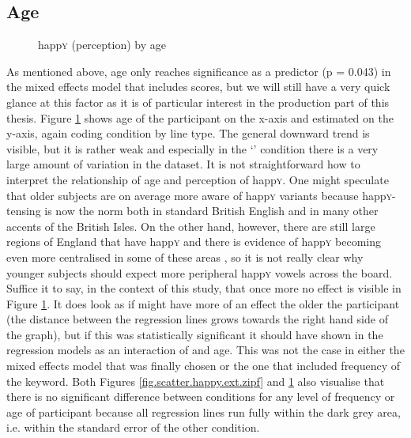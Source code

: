 \subsection{Age}
\label{sec.perc_res.happy.age}

\begin{figure}[h]
	\centering
		\resizebox{.49\linewidth}{!}{} 
	\caption{happ\textsc{y} (perception) by age}
	\label{fig.scatter.happy.ext.age}
\end{figure}

As mentioned above, age only reaches significance as a predictor (p = 0.043) in the mixed effects model that includes  scores, but we will still have a very quick glance at this factor as it is of particular interest in the production part of this thesis.
Figure \ref{fig.scatter.happy.ext.age} shows age of the participant on the x-axis and estimated  on the y-axis, again coding  condition by line type.
The general downward trend is visible, but it is rather weak and especially in the `' condition there is a very large amount of variation in the dataset.
It is not straightforward how to interpret the relationship of age and perception of happ\textsc{y}.
One might speculate that older subjects are on average more aware of  happ\textsc{y} variants because happ\textsc{y}-tensing is now the norm both in standard British English and in many other accents of the British Isles.
On the other hand, however, there are still large regions of England that have  happ\textsc{y} and there is evidence of happ\textsc{y} becoming even more centralised in some of these areas \parencite[cf.][]{flynn2010}, so it is not really clear why younger subjects should expect more peripheral happ\textsc{y} vowels across the board.
Suffice it to say, in the context of this study, that once more no  effect is visible in Figure \ref{fig.scatter.happy.ext.age}.
It does look as if  might have more of an effect the older the participant (the distance between the regression lines grows towards the right hand side of the graph), but if this was statistically significant it should have shown in the regression models as an interaction of  and age.
This was not the case in either the mixed effects model that was finally chosen or the one that included frequency of the keyword.
Both Figures \ref{fig.scatter.happy.ext.zipf} and \ref{fig.scatter.happy.ext.age} also visualise that there is no significant difference between  conditions for any level of frequency or age of participant because all regression lines run fully within the dark grey area, i.e. within the standard error of the other condition.

